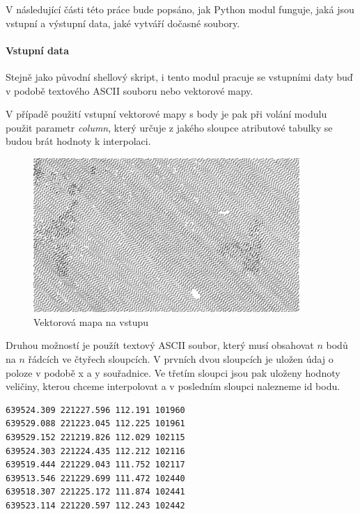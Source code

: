 \documentclass[12pt,a4paper]{article}
\begin{document}
V následující části této práce bude popsáno, jak Python modul
funguje, jaká jsou vstupní a výstupní data, jaké vytváří dočasné
soubory.

\paragraph{Vstupní data}

Stejně jako původní shellový skript, i tento modul pracuje se vstupními
daty buď v podobě textového ASCII souboru nebo vektorové mapy.

V případě použití vstupní vektorové mapy s body je pak při volání
modulu použit parametr \emph{column}, který určuje z jakého sloupce
atributové tabulky se budou brát hodnoty k interpolaci.

\begin{figure}[h!]
\centering
\includegraphics[width=0.9\textwidth]{img/vstup_vect_map.png}
\caption{Vektorová mapa na vstupu}
\label{fig:vstup_vect_map}
\end{figure}

\newpage

Druhou možností je použít textový ASCII soubor, který musí obsahovat
$n$ bodů na $n$ řádcích ve čtyřech sloupcích. V prvních dvou sloupcích
je uložen údaj o poloze v podobě x a y souřadnice. Ve třetím sloupci
jsou pak uloženy hodnoty veličiny, kterou chceme interpolovat a v
posledním sloupci nalezneme id bodu.

\begin{lstlisting}[caption={Příklad vstupního souboru}]
639524.309 221227.596 112.191 101960
639529.088 221223.045 112.225 101961
639529.152 221219.826 112.029 102115
639524.303 221224.435 112.212 102116
639519.444 221229.043 111.752 102117
639513.546 221229.699 111.472 102440
639518.307 221225.172 111.874 102441
639523.114 221220.597 112.243 102442
\end{lstlisting}
\end{document}
